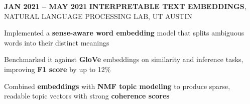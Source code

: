     \vspace{0.2 cm}
    \begin{twocolentry}{
        \textbf{JAN 2021 -- MAY 2021}
        }
        \textbf{INTERPRETABLE TEXT EMBEDDINGS}, NATURAL LANGUAGE PROCESSING LAB, UT AUSTIN
    \end{twocolentry}
    \begin{onecolentry}
        \vspace{0.05 cm}
        \begin{highlights}
            \item Implemented a \textbf{sense-aware word embedding} model that splits ambiguous words into their distinct meanings
            \item Benchmarked it against \textbf{GloVe} embeddings on similarity and inference tasks, improving \textbf{F1 score} by up to 12\%
            \item Combined \textbf{embeddings} with \textbf{NMF topic modeling} to produce sparse, readable topic vectors with strong \textbf{coherence scores}
        \end{highlights}
    \end{onecolentry}


